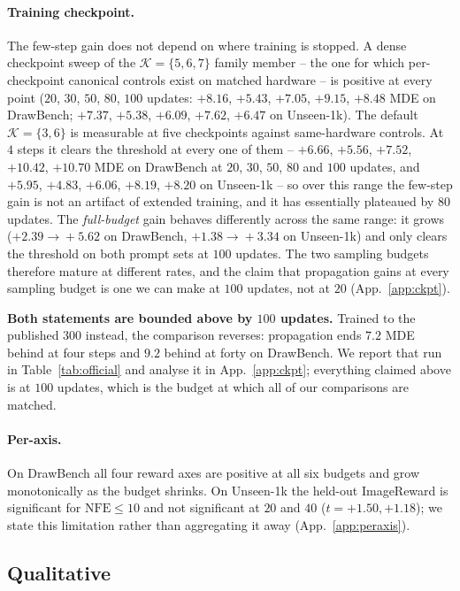 \paragraph{Training checkpoint.} The few-step gain does not depend on where training is
stopped. A dense checkpoint sweep of the $\mathcal K=\{5,6,7\}$ family member -- the one for
which per-checkpoint canonical controls exist on matched hardware -- is positive at every
point ($20$, $30$, $50$, $80$, $100$ updates: $+8.16$, $+5.43$, $+7.05$, $+9.15$, $+8.48$
MDE on DrawBench; $+7.37$, $+5.38$, $+6.09$, $+7.62$, $+6.47$ on Unseen-1k). The default
$\mathcal K=\{3,6\}$ is measurable at five checkpoints against same-hardware controls. At
$4$ steps it clears the threshold at every one of them -- $+6.66$, $+5.56$, $+7.52$,
$+10.42$, $+10.70$ MDE on DrawBench at $20$, $30$, $50$, $80$ and $100$ updates, and
$+5.95$, $+4.83$, $+6.06$, $+8.19$, $+8.20$ on Unseen-1k -- so over this range the few-step gain
is not an artifact of extended training, and it has essentially plateaued by $80$ updates.
The \emph{full-budget} gain behaves differently across the same range: it grows
($+2.39\!\to\!+5.62$ on DrawBench, $+1.38\!\to\!+3.34$ on Unseen-1k) and only clears the
threshold on both prompt sets at $100$ updates. The two sampling budgets therefore mature at
different rates, and the claim that propagation gains at every sampling budget is one we can
make at $100$ updates, not at $20$ (App.~\ref{app:ckpt}).

\textbf{Both statements are bounded above by $100$ updates.} Trained to the published $300$
instead, the comparison reverses: propagation ends $7.2$ MDE behind at four steps and $9.2$
behind at forty on DrawBench. We report that run in Table~\ref{tab:official} and analyse it
in App.~\ref{app:ckpt}; everything claimed above is at $100$ updates, which is the budget at
which all of our comparisons are matched.

\paragraph{Per-axis.} On DrawBench all four reward axes are positive at all six budgets
and grow monotonically as the budget shrinks. On Unseen-1k the held-out ImageReward is
significant for $\mathrm{NFE}\le10$ and not significant at $20$ and $40$
($t=+1.50,+1.18$); we state this limitation rather than aggregating it away
(App.~\ref{app:peraxis}).

\subsection{Qualitative}
\label{sec:exp:qual}

